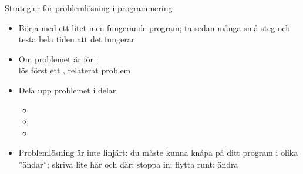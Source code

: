 \begin{Slide}{Strategier för problemlösning i programmering}
\begin{itemize}
\item Börja med ett litet men fungerande program; ta sedan många små steg och testa hela tiden att det fungerar
\item Om problemet är för :\\ lös först ett , relaterat problem 
\item Dela upp problemet i delar
\begin{itemize}
\item {}
\item {}
\item {}
\end{itemize}
\item Problemlösning är inte linjärt: du måste kunna knåpa på ditt program i olika ''ändar''; skriva lite här och där; stoppa in; flytta runt; ändra
\end{itemize}
\end{Slide}

